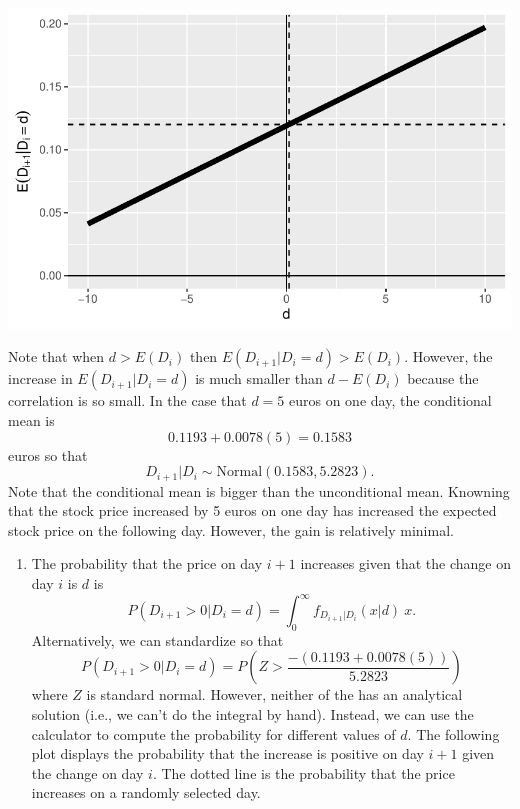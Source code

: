 \documentclass[
  letterpaper,
  DIV=11,
  numbers=noendperiod]{scrartcl}
\providecommand{\tightlist}{%
  \setlength{\itemsep}{0pt}\setlength{\parskip}{0pt}}\usepackage{longtable,booktabs,array}
\begin{document}
\begin{center}
\includegraphics{STAT2857A_examples_23_solutions_files/figure-pdf/unnamed-chunk-3-1.pdf}
\end{center}

Note that when \(d > E(D_i)\) then \(E(D_{i+1}|D_i=d)>E(D_i)\). However,
the increase in \(E(D_{i+1}|D_i=d)\) is much smaller than \(d-E(D_i)\)
because the correlation is so small. In the case that \(d=5\) euros on
one day, the conditional mean is \[
0.1193 + 0.0078 (5) = 0.1583
\] euros so that \[
D_{i+1}|D_i \sim \mbox{Normal}(0.1583, 5.2823).
\] Note that the conditional mean is bigger than the unconditional mean.
Knowning that the stock price increased by 5 euros on one day has
increased the expected stock price on the following day. However, the
gain is relatively minimal.

\begin{enumerate}
\def\labelenumi{\alph{enumi})}
\setcounter{enumi}{1}
\tightlist
\item
  The probability that the price on day \(i+1\) increases given that the
  change on day \(i\) is \(d\) is \[
  P(D_{i+1}>0|D_i=d)
  =\int_0^\infty f_{D_{i+1}|D_i}(x|d)~x.
  \] Alternatively, we can standardize so that \[
  P(D_{i+1}>0|D_i=d)
  =P\left(Z > \frac{-(0.1193 + 0.0078 (5))}{5.2823}\right)
  \] where \(Z\) is standard normal. However, neither of the has an
  analytical solution (i.e., we can't do the integral by hand). Instead,
  we can use the calculator to compute the probability for different
  values of \(d\). The following plot displays the probability that the
  increase is positive on day \(i+1\) given the change on day \(i\). The
  dotted line is the probability that the price increases on a randomly
  selected day.
\end{enumerate}
\end{document}
